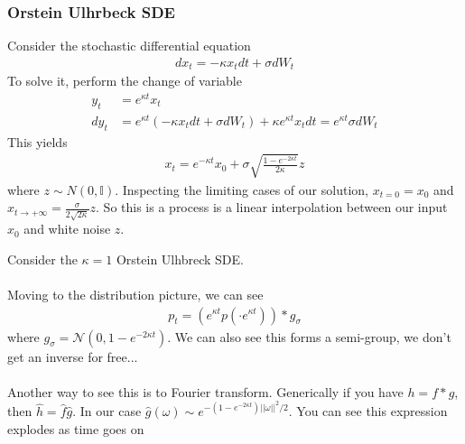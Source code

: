 \subsubsection{Orstein Ulhrbeck SDE}
Consider the stochastic differential equation
\begin{align}
	dx_t = - \kappa x_t dt + \sigma dW_t
\end{align}
To solve it, perform the change of variable 
\begin{align}
	y_t &= e^{\kappa t} x_t\\
	dy_t &= e^{\kappa t} (- \kappa x_t  dt + \sigma dW_t) + \kappa  e^{\kappa t}x_t dt = e^{\kappa t} \sigma dW_t
\end{align}
This yields 
\begin{align}
	x_t = e^{-\kappa t} x_0 + \sigma \sqrt{\frac{1 - e^{-2 \kappa t}}{2 \kappa}} z
\end{align}
where $z \sim N(0,\mathbb I)$. Inspecting the limiting cases of our solution, $x_{t=0} = x_0$ and $x_{t \to +\infty} = \frac{\sigma}{2\sqrt{2\kappa}} z$. So this is a process is a linear interpolation between our input $x_0$ and white noise $z$. 
\begin{sidework}
	Consider the $\kappa=1$ Orstein Ulhbreck SDE.
	\\
	\\
	Moving to the distribution picture, we can see
	\begin{align}
		p_t = (e^{\kappa t} p(\cdot e^{\kappa t})) * g_\sigma
	\end{align}
	where $g_\sigma = \mathcal N(0, 1-e^{-2 \kappa t})$. We can also see this forms a semi-group, we don't get an inverse for free...
	\\
	\\
	Another way to see this is to Fourier transform. Generically if you have $h = f * g$, then $\hat h = \hat f \hat g$. In our case $\hat g(\omega) \sim e^{- (1-e^{-2 \kappa t}) ||\omega||^2/2}$. You can see this expression explodes as time goes on
\end{sidework}
